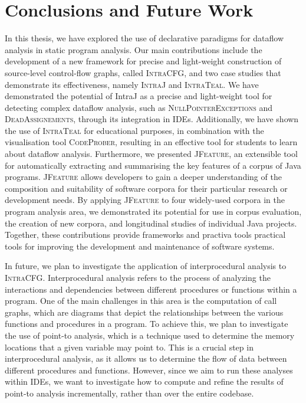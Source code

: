 \section{Conclusions and Future Work}%
\label{sec:kappa:conclusions}%
In this thesis, we have explored the use of declarative paradigms for
dataflow analysis in static program analysis. Our main contributions include the
development of a new framework for precise and light-weight construction of source-level
control-flow graphs, called \textsc{IntraCFG}, and two case studies that demonstrate
its effectiveness, namely \textsc{IntraJ} and \textsc{IntraTeal}. 
We have demonstrated the potential of IntraJ as a precise and light-weight tool
for detecting complex dataflow analysis, such as \textsc{NullPointerExceptions} and \textsc{DeadAssignements},
through its integration in IDEs. Additionally, we have shown the use of \textsc{IntraTeal}
for educational purposes, in combination with the visualisation tool \textsc{CodeProber},
resulting in an effective tool for students to learn about dataflow analysis. 
Furthermore, we presented  \textsc{JFeature}, an extensible tool for automatically 
extracting and summarising the key features of a corpus of Java programs. 
\textsc{JFeature} allows developers to gain a deeper understanding of the composition and 
suitability of software corpora for their particular research or development needs. 
By applying \textsc{JFeature} to four widely-used corpora in the program analysis area, 
we demonstrated its potential for use in corpus evaluation, the creation of new 
corpora, and longitudinal studies of individual Java projects. 
Together, these contributions provide frameworks and practiva tools practical tools 
for improving the development and maintenance of software systems.


In future, we plan to investigate the application of interprocedural analysis
to \textsc{IntraCFG}. Interprocedural analysis refers to the process of analyzing 
the interactions and dependencies between different procedures or functions within a
program. One of the main challenges in this area is the computation of call graphs,
which are diagrams that depict the relationships between the various functions and 
procedures in a program.
To achieve this, we plan to investigate the use of point-to analysis, which is a 
technique used to determine the memory locations that a given variable may point to. 
This is a crucial step in interprocedural analysis, as it allows us to determine 
the flow of data between different procedures and functions. However, since we aim 
to run these analyses within IDEs, we want to investigate how to compute and refine 
the results of point-to analysis incrementally, rather than over the entire codebase.

